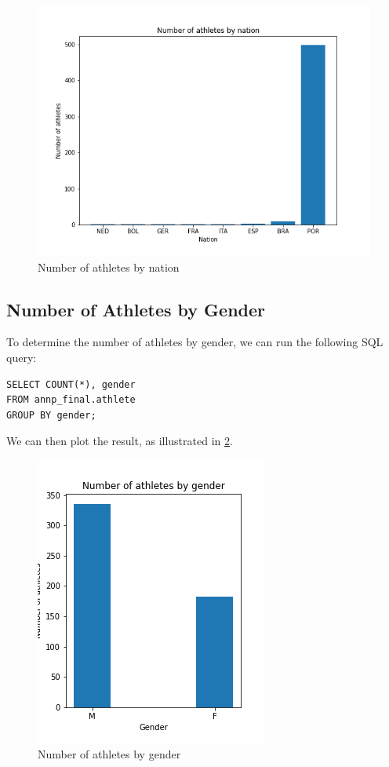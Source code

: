 \begin{figure}[H]
    \centering
    \includegraphics[width=.8\textwidth]{img/athletesbynation}
    \caption{Number of athletes by nation}
    \label{fig:athletesbynation}
\end{figure}

\subsection{Number of Athletes by Gender}\label{subsec:number-of-athletes-by-gender}

To determine the number of athletes by gender, we can run the following SQL query:

\begin{verbatim}
SELECT COUNT(*), gender
FROM annp_final.athlete
GROUP BY gender;
\end{verbatim}

We can then plot the result, as illustrated in \cref{fig:athletesbygender}.

\begin{figure}[H]
    \centering
    \includegraphics[width=.4\textwidth]{img/athletesbygender}
    \caption{Number of athletes by gender}
    \label{fig:athletesbygender}
\end{figure}

